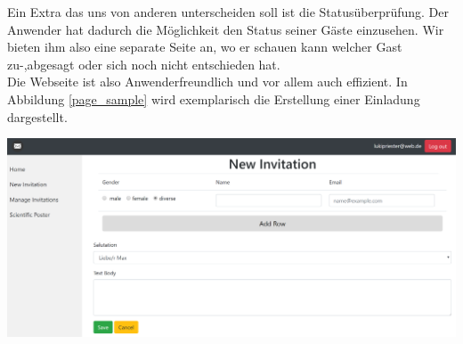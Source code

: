 \documentclass[landscape,a0paper,fontscale=0.35]{baposter} %
\begin{document}
\begin{poster}
{\begin{multicols}{3}
		Ein Extra das uns von anderen unterscheiden soll ist die Statusüberprüfung. Der Anwender hat dadurch die Möglichkeit den Status seiner Gäste einzusehen. Wir bieten ihm also eine separate Seite an, wo er schauen kann welcher Gast zu-,abgesagt oder sich noch nicht entschieden hat.\\
		Die Webseite ist also Anwenderfreundlich und vor allem auch effizient. In Abbildung \ref{page_sample} wird exemplarisch die Erstellung einer Einladung dargestellt.
		\begin{center}
					\includegraphics[width=0.6\linewidth]{New_Invitation_Seite.PNG}
			\label{page_sample}
		\end{center}

	\end{multicols}
	
	
	
}
\end{poster}
\end{document}
